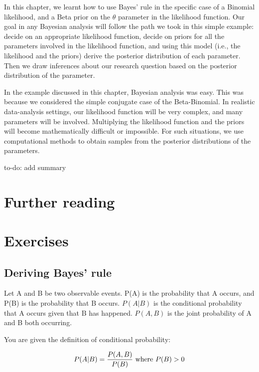 \documentclass[12pt,]{krantz}
\theoremstyle{definition}
\theoremstyle{definition}
\theoremstyle{definition}
\theoremstyle{remark}
\let\BeginKnitrBlock\begin \let\EndKnitrBlock\end
\begin{document}
In this chapter, we learnt how to use Bayes' rule in the specific case of a Binomial likelihood, and a Beta prior on the \(\theta\) parameter in the likelihood function. Our goal in any Bayesian analysis will follow the path we took in this simple example: decide on an appropriate likelihood function, decide on priors for all the parameters involved in the likelihood function, and using this model (i.e., the likelihood and the priors) derive the posterior distribution of each parameter. Then we draw inferences about our research question based on the posterior distribution of the parameter.

In the example discussed in this chapter, Bayesian analysis was easy. This was because we considered the simple conjugate case of the Beta-Binomial. In realistic data-analysis settings, our likelihood function will be very complex, and many parameters will be involved. Multiplying the likelihood function and the priors will become mathematically difficult or impossible. For such situations, we use computational methods to obtain samples from the posterior distributions of the parameters.

\BeginKnitrBlock{rmdnote}
to-do: add summary
\EndKnitrBlock{rmdnote}

\hypertarget{further-reading-1}{%
\section{Further reading}\label{further-reading-1}}

\hypertarget{exercises-1}{%
\section{Exercises}\label{exercises-1}}

\hypertarget{deriving-bayes-rule}{%
\subsection{Deriving Bayes' rule}\label{deriving-bayes-rule}}

Let A and B be two observable events. P(A) is the probability that A occurs, and P(B) is the probability that B occurs. \(P(A|B)\) is the conditional probability that A occurs given that B has happened. \(P(A,B)\) is the joint probability of A and B both occurring.

You are given the definition of conditional probability:

\begin{equation}
P(A|B)= \frac{P(A,B)}{P(B)} \hbox{ where } P(B)>0
\end{equation}
\end{document}
